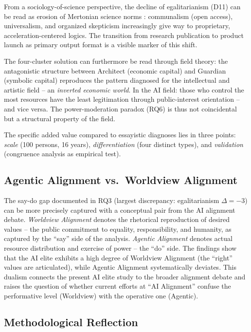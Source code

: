 \documentclass[12pt,a4paper]{article}
\begin{document}
From a sociology-of-science perspective, the decline of egalitarianism (D11) can be read as erosion of Mertonian science norms \citep{Merton1973}: communalism (open access), universalism, and organized skepticism increasingly give way to proprietary, acceleration-centered logics. The transition from research publication to product launch as primary output format is a visible marker of this shift.

The four-cluster solution can furthermore be read through field theory: the antagonistic structure between Architect (economic capital) and Guardian (symbolic capital) reproduces the pattern \citet{Bourdieu1992} diagnosed for the intellectual and artistic field -- an \emph{inverted economic world}. In the AI field: those who control the most resources have the least legitimation through public-interest orientation -- and vice versa. The power-moderation paradox (RQ6) is thus not coincidental but a structural property of the field.

The specific added value compared to essayistic diagnoses lies in three points: \emph{scale} (100 persons, 16 years), \emph{differentiation} (four distinct types), and \emph{validation} (congruence analysis as empirical test).


\subsection{Agentic Alignment vs.\ Worldview Alignment}
\label{sec:diskussion:alignment}

The say-do gap documented in RQ3 (largest discrepancy: egalitarianism $\Delta = -3$) can be more precisely captured with a conceptual pair from the AI alignment debate. \emph{Worldview Alignment} denotes the rhetorical reproduction of desired values -- the public commitment to equality, responsibility, and humanity, as captured by the ``say'' side of the analysis. \emph{Agentic Alignment} denotes actual resource distribution and exercise of power -- the ``do'' side. The findings show that the AI elite exhibits a high degree of Worldview Alignment (the ``right'' values are articulated), while Agentic Alignment systematically deviates. This dualism connects the present AI elite study to the broader alignment debate and raises the question of whether current efforts at ``AI Alignment'' confuse the performative level (Worldview) with the operative one (Agentic).


\subsection{Methodological Reflection}
\label{sec:diskussion:methodik}
\end{document}
